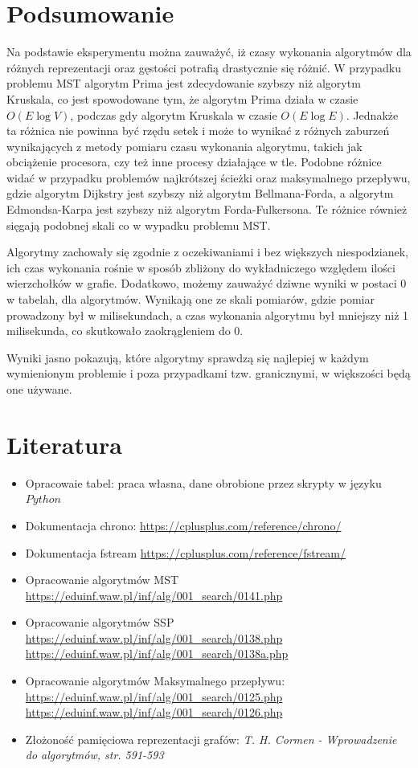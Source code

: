 \documentclass{article}
\begin{document}
\section{Podsumowanie}

Na podstawie eksperymentu można zauważyć, iż czasy wykonania algorytmów dla różnych reprezentacji oraz gęstości potrafią drastycznie się różnić.
W przypadku problemu MST algorytm Prima jest zdecydowanie szybszy niż algorytm Kruskala, co jest spowodowane tym, że algorytm Prima działa w czasie $O(E \log V)$, podczas gdy algorytm Kruskala w czasie $O(E \log E)$.
Jednakże ta różnica nie powinna być rzędu setek i może to wynikać z różnych zaburzeń wynikających z metody pomiaru czasu wykonania algorytmu, takich jak obciążenie procesora, czy też inne procesy działające w tle.
Podobne różnice widać w przypadku problemów najkrótszej ścieżki oraz maksymalnego przepływu, gdzie algorytm Dijkstry jest szybszy niż algorytm Bellmana-Forda, a algorytm Edmondsa-Karpa jest szybszy niż algorytm Forda-Fulkersona.
Te różnice również sięgają podobnej skali co w wypadku problemu MST. 

Algorytmy zachowały się zgodnie z oczekiwaniami i bez większych niespodzianek, ich czas wykonania rośnie w sposób zbliżony do wykładniczego względem ilości wierzchołków w grafie.
Dodatkowo, możemy zauważyć dziwne wyniki w postaci 0 w tabelah, dla algorytmów. Wynikają one ze skali pomiarów, gdzie pomiar prowadzony był
w milisekundach, a czas wykonania algorytmu był mniejszy niż 1 milisekunda, co skutkowało zaokrągleniem do 0.

Wyniki jasno pokazują, które algorytmy sprawdzą się najlepiej w każdym wymienionym problemie i poza przypadkami tzw. granicznymi, w większości będą one używane.
\section{Literatura}
\begin{itemize}
    \item Opracowaie tabel: praca własna, dane obrobione przez skrypty w języku $Python$
    \item Dokumentacja chrono: \url{https://cplusplus.com/reference/chrono/}
    \item Dokumentacja fstream \url{https://cplusplus.com/reference/fstream/}
    \item Opracowanie algorytmów MST \url{https://eduinf.waw.pl/inf/alg/001_search/0141.php}
    \item Opracowanie algorytmów SSP \\ \url{https://eduinf.waw.pl/inf/alg/001_search/0138.php} \\ \url{https://eduinf.waw.pl/inf/alg/001_search/0138a.php}
    \item Opracowanie algorytmów Maksymalnego przepływu: \\ \url{https://eduinf.waw.pl/inf/alg/001_search/0125.php} \\ \url{https://eduinf.waw.pl/inf/alg/001_search/0126.php}
    \item Złożoność pamięciowa reprezentacji grafów: \textit{T. H. Cormen - Wprowadzenie do algorytmów, str. 591-593}
\end{itemize}
\end{document}
